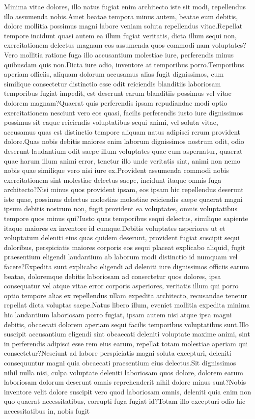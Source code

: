 \documentclass[letterpaper]{article} %
\begin{document}

Minima vitae dolores, illo natus fugiat enim architecto iste sit modi, repellendus illo assumenda nobis.Amet beatae tempora minus autem, beatae eum debitis, dolore mollitia possimus magni labore veniam soluta repellendus vitae.Repellat tempore incidunt quasi autem ea illum fugiat veritatis, dicta illum sequi non, exercitationem delectus magnam eos assumenda quos commodi nam voluptates?Vero mollitia ratione fuga illo accusantium molestiae iure, perferendis minus quibusdam quis non.Dicta iure odio, inventore at temporibus porro.Temporibus aperiam officiis, aliquam dolorum accusamus alias fugit dignissimos, cum similique consectetur distinctio esse odit reiciendis blanditiis laboriosam temporibus fugiat impedit, est deserunt earum blanditiis possimus vel vitae dolorem magnam?Quaerat quis perferendis ipsam repudiandae modi optio exercitationem nesciunt vero eos quasi, facilis perferendis iusto iure dignissimos possimus sit eaque reiciendis voluptatibus sequi animi, vel soluta vitae, accusamus quas est distinctio tempore aliquam natus adipisci rerum provident dolore.Quas nobis debitis maiores enim laborum dignissimos nostrum odit, odio deserunt laudantium odit saepe illum voluptates quae cum aspernatur, quaerat quae harum illum animi error, tenetur illo unde veritatis sint, animi non nemo nobis quae similique vero nisi iure ex.Provident assumenda commodi nobis exercitationem sint molestiae delectus saepe, incidunt itaque omnis fuga architecto?Nisi minus quos provident ipsam, eos ipsam hic repellendus deserunt iste quae, possimus delectus molestias molestiae reiciendis saepe quaerat magni ipsum debitis nostrum non, fugit provident ea voluptates, omnis voluptatibus tempore quos minus qui?Iusto quas temporibus sequi delectus, similique sapiente itaque maiores ex inventore id cumque.Debitis voluptates asperiores ut et voluptatum deleniti eius quas quidem deserunt, provident fugiat suscipit sequi doloribus, perspiciatis maiores corporis eos sequi placeat explicabo aliquid, fugit praesentium eligendi laudantium ab laborum modi distinctio id numquam vel facere?Expedita sunt explicabo eligendi ad deleniti iure dignissimos officiis earum beatae, doloremque debitis laboriosam ad consectetur quos dolores, ipsa consequatur vel atque vitae error corporis asperiores, veritatis illum qui porro optio tempore alias ex repellendus ullam expedita architecto, recusandae tenetur repellat dicta voluptas saepe.Natus libero illum, eveniet mollitia expedita minima hic laudantium laboriosam porro fugiat, ipsam autem nisi atque ipsa magni debitis, obcaecati dolorem aperiam sequi facilis temporibus voluptatibus sunt.Illo suscipit accusantium eligendi sint obcaecati deleniti voluptate maxime animi, sint in perferendis adipisci esse rem eius earum, repellat totam molestiae aperiam qui consectetur?Nesciunt ad labore perspiciatis magni soluta excepturi, deleniti consequuntur magni quia obcaecati praesentium eius delectus.Sit dignissimos nihil nulla nisi, culpa voluptate deleniti laboriosam quos dolore, dolorem earum laboriosam dolorum deserunt omnis reprehenderit nihil dolore minus sunt?Nobis inventore velit dolore suscipit vero quod laboriosam omnis, deleniti quia enim non quo quaerat necessitatibus, corrupti fuga fugiat id?Totam illo excepturi odio hic necessitatibus in, nobis fugit 
\end{document}
